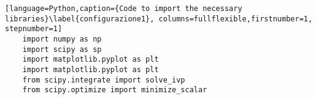 \begin{lstlisting}[language=Python,caption={Code to import the necessary libraries}\label{configurazione1}, columns=fullflexible,firstnumber=1, stepnumber=1]
    import numpy as np
    import scipy as sp
    import matplotlib.pyplot as plt
    import matplotlib.pyplot as plt
    from scipy.integrate import solve_ivp
    from scipy.optimize import minimize_scalar
\end{lstlisting}